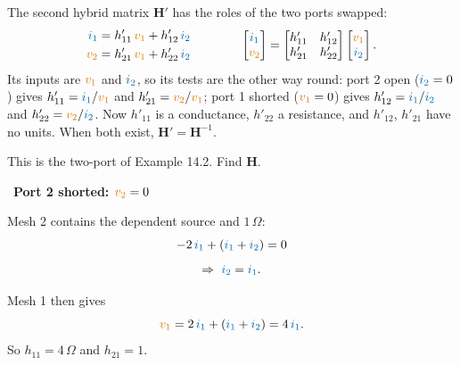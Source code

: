 \documentclass[11pt,a4paper]{article}
\newcommand{\Icol}[1]{\textcolor{ccur}{#1}}
\newcommand{\Vcol}[1]{\textcolor{cvolt}{#1}}
\newif\ifsolfirst
\newcommand{\solution}{\par\smallskip\noindent{\color{cpow}\bfseries Solution}\par\nobreak\smallskip\global\solfirsttrue}
\newcommand{\solstep}[2]{\par\ifsolfirst\global\solfirstfalse\else\bigskip\needspace{5\baselineskip}\fi
  \noindent{\color{cpow}\bfseries Step #1.}\ {\bfseries #2}\par\nobreak\smallskip}
\newcommand{\ohm}{\,\Omega}
\newcommand{\vone}{\Vcol{v_1}}  \newcommand{\vtwo}{\Vcol{v_2}}
\newcommand{\ione}{\Icol{i_1}}  \newcommand{\itwo}{\Icol{i_2}}
\newcommand{\Hm}{\mathbf{H}}  \newcommand{\Tm}{\mathbf{T}}
\newcommand{\lR}[3]{\node[anchor=west, xshift=7pt, font=\small] at (#1,#2) {#3};}
\newcommand{\pone}[2]{%
  \draw (#1,#2) node[ocirc] {}; \draw (#1,0) node[ocirc] {};
  \draw[iar] (#1+0.2,#2+0.28) -- (#1+0.75,#2+0.28); \node[font=\small, text=ccur] at (#1+0.48,#2+0.58) {$i_1$};
  \node[pol] at (#1+0.3,0.72*#2) {$+$}; \node[pol] at (#1+0.3,0.22*#2) {$-$};
  \node[font=\small, text=cvolt] at (#1+0.32,0.47*#2) {$v_1$};}
\newcommand{\ptwo}[2]{%
  \draw (#1,#2) node[ocirc] {}; \draw (#1,0) node[ocirc] {};
  \draw[iar] (#1-0.2,#2+0.28) -- (#1-0.75,#2+0.28); \node[font=\small, text=ccur] at (#1-0.48,#2+0.58) {$i_2$};
  \node[pol] at (#1-0.3,0.72*#2) {$+$}; \node[pol] at (#1-0.3,0.22*#2) {$-$};
  \node[font=\small, text=cvolt] at (#1-0.32,0.47*#2) {$v_2$};}
\newcommand{\exTee}[4][2]{%
  \draw (0,2.2) -- (0.9,2.2) to[R, l=#3] (2.6,2.2) -- (4.3,2.2);
  \draw (4.3,2.2) to[american controlled voltage source, l=$\Vcol{#1\,i_1}$] (5.9,2.2) -- (6.9,2.2);
  \draw (2.6,2.2) to[R] (2.6,0); \lR{2.6}{1.1}{#4}
  \draw (0,0) -- (6.9,0);
  \fill (2.6,2.2) circle (1.7pt); \fill (2.6,0) circle (1.7pt);
  \ifcase#2
    \pone{0}{2.2} \ptwo{6.9}{2.2}
  \or
    \pone{0}{2.2}
    \draw (6.9,2.2) node[ocirc] {}; \draw (6.9,0) node[ocirc] {};
    \node[pol] at (6.6,1.6) {$+$}; \node[pol] at (6.6,0.5) {$-$};
    \node[font=\small, text=cvolt] at (6.58,1.05) {$v_2$};
    \node[font=\small, text=ccur, anchor=west] at (7.05,2.2) {$i_2 = 0$};
  \or
    \draw (0,2.2) node[ocirc] {}; \draw (0,0) node[ocirc] {};
    \node[pol] at (0.3,1.6) {$+$}; \node[pol] at (0.3,0.5) {$-$};
    \node[font=\small, text=cvolt] at (0.32,1.05) {$v_1$};
    \node[font=\small, text=ccur, anchor=east] at (-0.15,2.2) {$i_1 = 0$};
    \ptwo{6.9}{2.2}
  \or
    \pone{0}{2.2}
    \draw (6.9,2.2) -- (6.9,0);
    \draw[iar] (6.65,2.5) -- (6.1,2.5); \node[font=\small, text=ccur] at (6.38,2.8) {$i_2$};
    \node[font=\small, text=cvolt, anchor=west] at (7.05,1.1) {$v_2 = 0$};
  \fi}
\begin{document}
The second hybrid matrix $\Hm'$ has the roles of the two ports swapped:
\[
  \begin{aligned}
    \ione &= h'_{11}\,\vone + h'_{12}\,\itwo\\
    \vtwo &= h'_{21}\,\vone + h'_{22}\,\itwo
  \end{aligned}
  \qquad\qquad
  \begin{bmatrix} \ione\\ \vtwo \end{bmatrix}
  = \begin{bmatrix} h'_{11} & h'_{12}\\ h'_{21} & h'_{22} \end{bmatrix}
    \begin{bmatrix} \vone\\ \itwo \end{bmatrix} .
\]
Its inputs are $\vone$ and $\itwo$, so its tests are the other way round: port 2 open
($\itwo = 0$) gives $h'_{11} = \ione/\vone$ and $h'_{21} = \vtwo/\vone$; port 1 shorted
($\vone = 0$) gives $h'_{12} = \ione/\itwo$ and $h'_{22} = \vtwo/\itwo$. Now $h'_{11}$ is a
conductance, $h'_{22}$ a resistance, and $h'_{12}$, $h'_{21}$ have no units. When both exist,
$\Hm' = \Hm^{-1}$.

\bigskip
\begin{examplebox}
\begin{center}
\end{center}
This is the two-port of Example 14.2. Find $\Hm$.
\end{examplebox}

\solution

\solstep{1}{Port 2 shorted: $\vtwo = 0$}
\begin{minipage}[c]{0.56\linewidth}
\centering
{}
\end{minipage}\hfill
\begin{minipage}[c]{0.4\linewidth}
Mesh 2 contains the dependent source and $1\ohm$:
\[
  -2\,\ione + (\ione + \itwo) = 0
\]
\[
  \Rightarrow\ \itwo = \ione .
\]
\end{minipage}

\smallskip
Mesh 1 then gives
\[
  \vone = 2\,\ione + (\ione + \itwo) = 4\,\ione .
\]
So $h_{11} = 4\ohm$ and $h_{21} = 1$.
\end{document}
